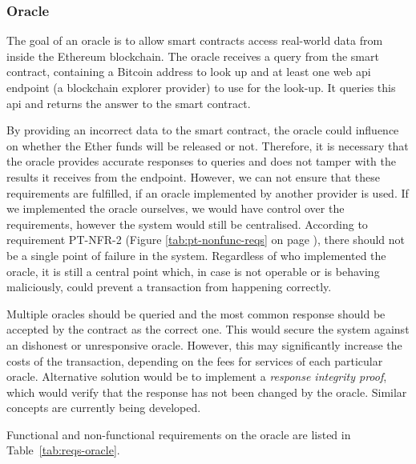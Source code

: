 \subsubsection{Oracle}
The goal of an oracle is to allow smart contracts access real-world data from inside the Ethereum blockchain. The oracle receives a query from the smart contract, containing a Bitcoin address to look up and at least one web \acrshort{api} endpoint (a blockchain explorer provider) to use for the look-up. It queries this \acrshort{api} and returns the answer to the smart contract.

By providing an incorrect data to the smart contract, the oracle could influence on whether the Ether funds will be released or not. Therefore, it is necessary that the oracle provides accurate responses to queries and does not tamper with the results it receives from the endpoint. However, we can not ensure that these requirements are fulfilled, if an oracle implemented by another provider is used. If we implemented the oracle ourselves, we would have control over the requirements, however the system would still be centralised. According to requirement PT-NFR-2 (Figure \ref{tab:pt-nonfunc-reqs} on page \pageref{tab:pt-nonfunc-reqs}), there should not be a single point of failure in the system. Regardless of who implemented the oracle, it is still a central point which, in case is not operable or is behaving maliciously, could prevent a transaction from happening correctly.

Multiple oracles should be queried and the most common response should be accepted by the contract as the correct one. This would secure the system against an dishonest or unresponsive oracle. However, this may significantly increase the costs of the transaction, depending on the fees for services of each particular oracle. Alternative solution would be to implement a \textit{response integrity proof}, which would verify that the response has not been changed by the oracle. Similar concepts are currently being developed\footnotemark.
% 

Functional and non-functional requirements on the oracle are listed in Table~\ref{tab:reqs-oracle}.

